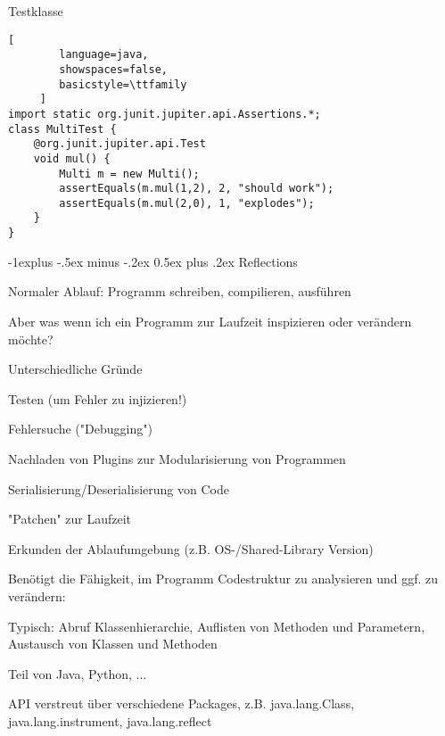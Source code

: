 \documentclass[10pt]{article}
\makeatletter
\renewcommand{\subsection}{\@startsection{subsection}{2}{0mm}%
                                {-1explus -.5ex minus -.2ex}%
                                {0.5ex plus .2ex}%
                                {\normalfont\normalsize\bfseries}}
\makeatother
\begin{document}
Testklasse
\begin{lstlisting}[
        language=java,
        showspaces=false,
        basicstyle=\ttfamily
     ]
import static org.junit.jupiter.api.Assertions.*;
class MultiTest {
    @org.junit.jupiter.api.Test
    void mul() {
        Multi m = new Multi();
        assertEquals(m.mul(1,2), 2, "should work");
        assertEquals(m.mul(2,0), 1, "explodes");
    }
}
\end{lstlisting}

\subsection{Reflections}

\begin{itemize*}
  \item Normaler Ablauf: Programm schreiben, compilieren, ausführen
  \begin{itemize*}
    \item Aber was wenn ich ein Programm zur Laufzeit inspizieren oder verändern möchte?
  \end{itemize*}
  \item Unterschiedliche Gründe
  \begin{itemize*}
    \item Testen (um Fehler zu injizieren!)
    \item Fehlersuche ("Debugging")
    \item Nachladen von Plugins zur Modularisierung von Programmen
    \item Serialisierung/Deserialisierung von Code
    \item "Patchen" zur Laufzeit
    \item Erkunden der Ablaufumgebung (z.B. OS-/Shared-Library Version)
  \end{itemize*}
  \item Benötigt die Fähigkeit, im Programm Codestruktur zu analysieren und ggf. zu verändern:
  \begin{itemize*}
    \item Typisch: Abruf Klassenhierarchie, Auflisten von Methoden und Parametern, Austausch von Klassen und Methoden
    \item Teil von Java, Python, ...
  \end{itemize*}
\end{itemize*}

API verstreut über verschiedene Packages, z.B. java.lang.Class, java.lang.instrument, java.lang.reflect
\end{document}
